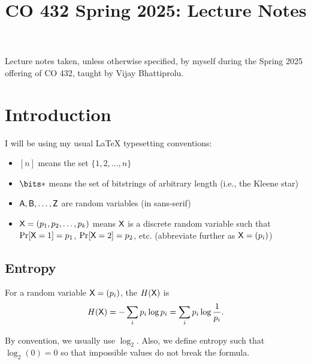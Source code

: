 \documentclass[class=co432,notes,tikz]{agony}
\title{CO 432 Spring 2025: Lecture Notes}
\begin{document}
\renewcommand{\contentsname}{CO 432 Spring 2025:\\{\huge Lecture Notes}}
\thispagestyle{firstpage}
\tableofcontents

Lecture notes taken, unless otherwise specified,
by myself during the Spring 2025 offering of CO 432,
taught by Vijay Bhattiprolu.

\begin{multicols}{2}
  \listoflecture
\end{multicols}

\chapter{Introduction}

\begin{notation}
  I will be using my usual \LaTeX{} typesetting conventions:
  \begin{itemize}[nosep]
    \item $[n]$ means the set $\{1,2,\dotsc,n\}$
    \item $\bits*$ means the set of bitstrings of arbitrary length (i.e., the Kleene star)
    \item $\mathsf A, \mathsf B, \dotsc, \mathsf Z$ are random variables (in sans-serif)
    \item $\mathsf X = (p_1,p_2,\dotsc,p_k)$ means $\mathsf X$ is a discrete random variable
          such that $\Pr[\mathsf X = 1] = p_1$, $\Pr[\mathsf X=2] = p_2$, etc.
          (abbreviate further as $\mathsf X = (p_i)$)
  \end{itemize}
\end{notation}

\section{Entropy}


\begin{defn}[entropy]
  For a random variable $\mathsf X = (p_i)$,
  the  $H(\mathsf X)$ is
  \[ H(\mathsf X) = -\sum_i p_i \log p_i = \sum_i p_i \log \frac{1}{p_i}. \]
\end{defn}

\begin{convention}
  By convention, we usually use $\log_2$.
  Also, we define entropy such that $\log_2(0) = 0$ so that
  impossible values do not break the formula.
\end{convention}
\end{document}
